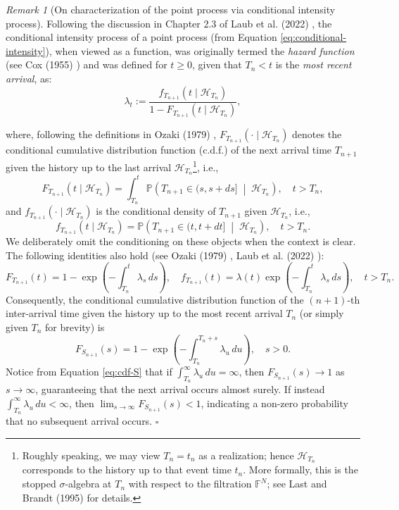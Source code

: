 \documentclass[12pt,a4paper]{report}
\theoremstyle{plain}
\theoremstyle{definition}
\theoremstyle{remark}
\newtheorem{remark}{Remark}[section]
\newcommand{\1}{\mathbf{1}}
\begin{document}
\begin{remark}[On characterization of the point process via conditional intensity process]\label{rem:cdf}
\noindent
Following the discussion in Chapter 2.3 of Laub et al. (2022) \cite{LLT22}, the conditional intensity process of a point process (from Equation \ref{eq:conditional-intensity}), when viewed as a function, was originally termed the \emph{hazard function} (see Cox (1955) \cite{Cox55}) and was defined for $t\ge0$, given that $T_n < t$ is the \emph{most recent arrival}, as:
\[
\lambda_t := \frac{f_{T_{n+1}}(t \mid \mathcal{H}_{T_n})}{1 - F_{T_{n+1}}(t \mid \mathcal{H}_{T_n})},
\]

\medskip
\noindent
where, following the definitions in Ozaki (1979) \cite{Oza79},
$F_{T_{n+1}}(\cdot \mid \mathcal{H}_{T_n})$ denotes the conditional cumulative distribution function (c.d.f.) of the next arrival time $T_{n+1}$ given the history up to the last arrival $\mathcal{H}_{T_n}$\footnote{Roughly speaking, we may view $T_n = t_n$ as a realization; hence $\mathcal{H}_{T_n}$ corresponds to the history up to that event time $t_n$. More formally, this is the stopped $\sigma$-algebra at $T_n$ with respect to the filtration $\mathbb{F}^N$; see Last and Brandt (1995) \cite{LB95} for details.}, i.e.,
\[
F_{T_{n+1}}(t \mid \mathcal{H}_{T_n}) = \int_{T_n}^{t} \mathbb{P}\!\left( T_{n+1} \in (s, s+ds] \;\middle|\; \mathcal{H}_{T_n} \right), \quad t > T_n,
\]
and $f_{T_{n+1}}(\cdot \mid \mathcal{H}_{T_n})$ is the conditional density of $T_{n+1}$ given $\mathcal{H}_{T_n}$, i.e.,
\[
f_{T_{n+1}}(t \mid \mathcal{H}_{T_n}) = \mathbb{P}\!\left( T_{n+1} \in (t, t+dt] \;\middle|\; \mathcal{H}_{T_n} \right), \quad t > T_n.
\]
\noindent
We deliberately omit the conditioning on these objects when the context is clear. The following identities also hold (see Ozaki (1979) \cite{Oza79}, Laub et al. (2022) \cite{LLT22}):
\[
F_{T_{n+1}}(t) = 1 - \exp\left(-\int_{T_n}^t \lambda_s \, ds\right),\quad
f_{T_{n+1}}(t) = \lambda(t) \exp\left(-\int_{T_n}^t \lambda_s \, ds\right), \quad t > T_n.
\]
Consequently, the conditional cumulative distribution function of the $(n+1)$-th inter-arrival time given the history up to the most recent arrival $T_n$ (or simply given $T_n$ for brevity) is
\begin{equation}\label{eq:cdf-S}
    F_{S_{n+1}}(s) = 1 - \exp\left(-\int_{T_n}^{T_n+s} \lambda_u \, du\right), \quad s > 0.
\end{equation}
Notice from Equation \eqref{eq:cdf-S} that if $\int_{T_n}^{\infty} \lambda_u \, du = \infty$, then $F_{S_{n+1}}(s) \to 1$ as $s \to \infty$, guaranteeing that the next arrival occurs almost surely. If instead $\int_{T_n}^{\infty} \lambda_u \, du < \infty$, then $\lim_{s\to\infty} F_{S_{n+1}}(s) < 1$, indicating a non-zero probability that no subsequent arrival occurs.
\hfill $\square$
\end{remark}
\end{document}
